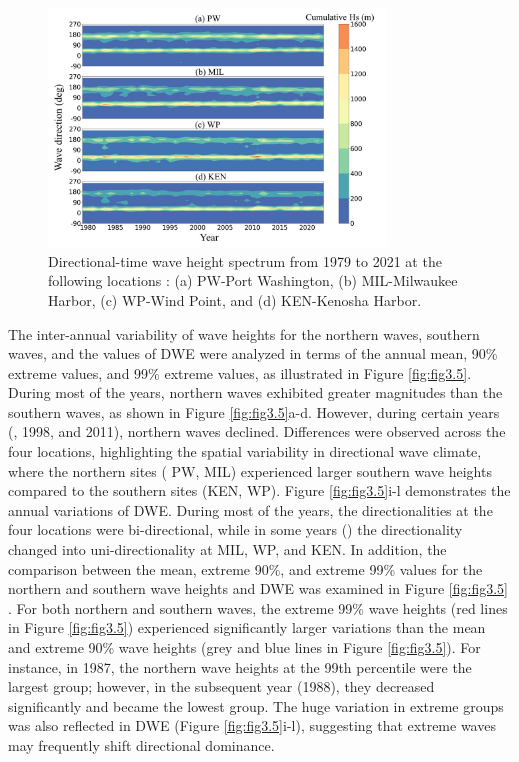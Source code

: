 \begin{figure}[htbp]
  \centering
  \includegraphics[width=0.8\textwidth]{chapter3/resources/figure3-4.jpg}
  \caption{Directional-time wave height spectrum from 1979 to 2021 at the following locations : (a) PW-Port Washington, (b) MIL-Milwaukee Harbor, (c) WP-Wind Point, and (d) KEN-Kenosha Harbor.}
  \label{fig:fig3.4}
\end{figure}

The inter-annual variability of wave heights for the northern waves, southern
waves, and the values of DWE were analyzed in terms of the annual mean, 90\%
extreme values, and 99\% extreme values, as illustrated in Figure
\ref{fig:fig3.5}. During most of the years, northern waves exhibited greater
magnitudes than the southern waves, as shown in Figure \ref{fig:fig3.5}a-d.
However, during certain years (, 1998, and 2011), northern waves
declined. Differences were observed across the four locations, highlighting the
spatial variability in directional wave climate, where the northern sites (\eg
PW, MIL) experienced larger southern wave heights compared to the southern sites
(\eg KEN, WP). Figure \ref{fig:fig3.5}i-l demonstrates the annual variations
of DWE. During most of the years, the directionalities at the four locations
were bi-directional, while in some years () the directionality changed
into uni-directionality at MIL, WP, and KEN. In addition, the comparison between
the mean, extreme 90\%, and extreme 99\% values for the northern and southern
wave heights and DWE was examined in Figure \ref{fig:fig3.5} . For both northern
and southern waves, the extreme 99\% wave heights (red lines in Figure
\ref{fig:fig3.5}) experienced significantly larger variations than the mean and
extreme 90\% wave heights (grey and blue lines in Figure \ref{fig:fig3.5}). For
instance, in 1987, the northern wave heights at the 99th percentile were the
largest group; however, in the subsequent year (1988), they decreased
significantly and became the lowest group. The huge variation in extreme groups
was also reflected in DWE (Figure \ref{fig:fig3.5}i-l), suggesting that
extreme waves may frequently shift directional dominance.

